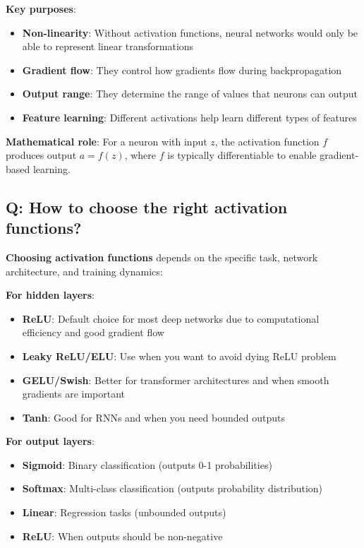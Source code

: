 \textbf{Key purposes}:
\begin{itemize}
	\item \textbf{Non-linearity}: Without activation functions, neural networks would only be able to represent linear transformations
	\item \textbf{Gradient flow}: They control how gradients flow during backpropagation
	\item \textbf{Output range}: They determine the range of values that neurons can output
	\item \textbf{Feature learning}: Different activations help learn different types of features
\end{itemize}

\textbf{Mathematical role}: For a neuron with input $z$, the activation function $f$ produces output $a = f(z)$, where $f$ is typically differentiable to enable gradient-based learning.

\subsection*{\textcolor{primaryteal}{Q: How to choose the right activation functions?}}
\textbf{Choosing activation functions} depends on the specific task, network architecture, and training dynamics:

\textbf{For hidden layers}:
\begin{itemize}
	\item \textbf{ReLU}: Default choice for most deep networks due to computational efficiency and good gradient flow
	\item \textbf{Leaky ReLU/ELU}: Use when you want to avoid dying ReLU problem
	\item \textbf{GELU/Swish}: Better for transformer architectures and when smooth gradients are important
	\item \textbf{Tanh}: Good for RNNs and when you need bounded outputs
\end{itemize}

\textbf{For output layers}:
\begin{itemize}
	\item \textbf{Sigmoid}: Binary classification (outputs 0-1 probabilities)
	\item \textbf{Softmax}: Multi-class classification (outputs probability distribution)
	\item \textbf{Linear}: Regression tasks (unbounded outputs)
	\item \textbf{ReLU}: When outputs should be non-negative
\end{itemize}

